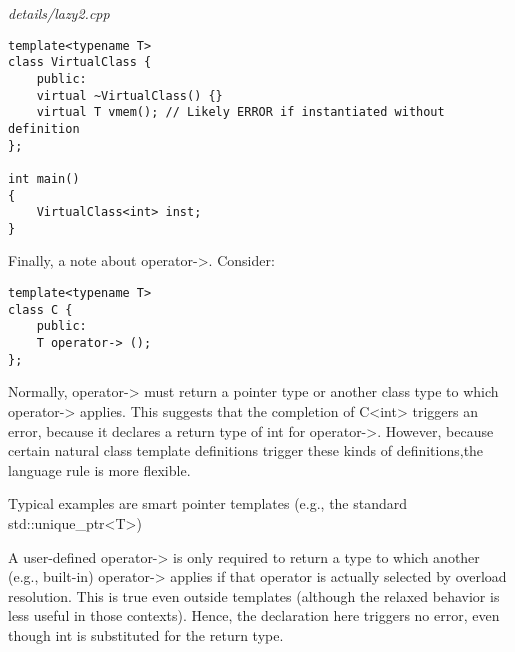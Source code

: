 \noindent
\textit{details/lazy2.cpp}
\begin{lstlisting}[style=styleCXX]
template<typename T>
class VirtualClass {
	public:
	virtual ~VirtualClass() {}
	virtual T vmem(); // Likely ERROR if instantiated without definition
};

int main()
{
	VirtualClass<int> inst;
}
\end{lstlisting}

Finally, a note about operator->. Consider:

\begin{lstlisting}[style=styleCXX]
template<typename T>
class C {
	public:
	T operator-> ();
};
\end{lstlisting}

Normally, operator-> must return a pointer type or another class type to which operator-> applies. This suggests that the completion of C<int> triggers an error, because it declares a return type of int for operator->. However, because certain natural class template definitions trigger these kinds of definitions,the language rule is more flexible.

\begin{tcolorbox}[colback=webgreen!5!white,colframe=webgreen!75!black]
\hspace*{0.75cm}Typical examples are smart pointer templates (e.g., the standard std::unique\_ptr<T>)
\end{tcolorbox}

A user-defined operator-> is only required to return a type to which another (e.g., built-in) operator-> applies if that operator is actually selected by overload resolution. This is true even outside templates (although the relaxed behavior is less useful in those contexts). Hence, the declaration here triggers no error, even though int is substituted for the return type.







































